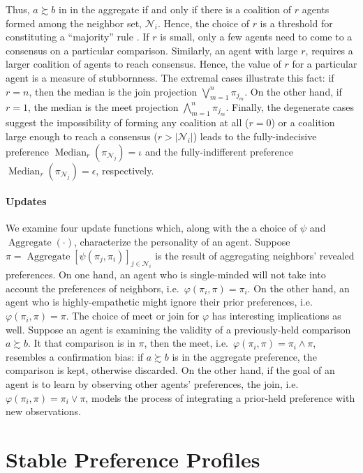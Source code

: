 \documentclass[conference]{ieeeconf}
\newcommand{\N}{\mathcal{N}}
\newcommand{\prefers}{\succsim}
\newcommand{\join}{\vee}
\newcommand{\meet}{\wedge}
\newcommand{\bigjoin}{\bigvee}
\newcommand{\bigmeet}{\bigwedge}
\DeclareMathOperator{\Aggregate}{Aggregate}
\DeclareMathOperator{\Median}{Median}
\begin{document}
Thus, $a \prefers b$ in in the aggregate if and only if there is a coalition of $r$ agents formed among the neighbor set, $\N_i$. Hence, the choice of $r$ is a threshold for constituting a ``majority'' rule \cite{buchanan1965calculus}. If $r$ is small, only a few agents need to come to a consensus on a particular comparison. Similarly, an agent with large $r$, requires a larger coalition of agents to reach consensus. Hence, the value of $r$ for a particular agent is a measure of stubbornness. The extremal cases illustrate this fact: if $r= n$, then the median is the join projection $\bigjoin_{m=1}^n \pi_{j_m}$. On the other hand, if $r=1$, the median is the meet projection $\bigmeet_{m=1}^n \pi_{j_m}$. Finally, the degenerate cases suggest the impossibility of forming any coalition at all ($r=0$) or a coalition large enough to reach a consensus ($r > |\N_i|$) leads to the fully-indecisive preference $\Median_r(\pi_{\N_j}) = \iota$ and the fully-indifferent preference $\Median_r(\pi_{\N_j}) = \epsilon$, respectively.

\paragraph*{Updates}
We examine four update functions which, along with the a choice of $\psi$ and $\Aggregate(\cdot)$, characterize the personality of an agent. Suppose $\pi = \Aggregate\left[\psi(\pi_j,\pi_i)\right]_{j \in \N_i}$ is the result of aggregating neighbors' revealed preferences. On one hand, an agent who is single-minded will not take into account the preferences of neighbors, i.e.~$\varphi(\pi_i,\pi) = \pi_i$. On the other hand, an agent who is highly-empathetic might ignore their prior preferences, i.e.~$\varphi(\pi_i,\pi) = \pi$. The choice of meet or join for $\varphi$ has interesting implications as well. Suppose an agent is examining the validity of a previously-held comparison $a \prefers b$. It that comparison is in $\pi$, then the meet, i.e.~$\varphi(\pi_i,\pi) = \pi_i \meet \pi$, resembles a confirmation bias: if $a \prefers b$ is in the aggregate preference, the comparison is kept, otherwise discarded. On the other hand, if the goal of an agent is to learn by observing other agents' preferences, the join, i.e.~$\varphi(\pi_i,\pi) = \pi_i \join \pi$, models the process of integrating a prior-held preference with new observations.

\section{Stable Preference Profiles}
\label{sec:stable}
\end{document}
